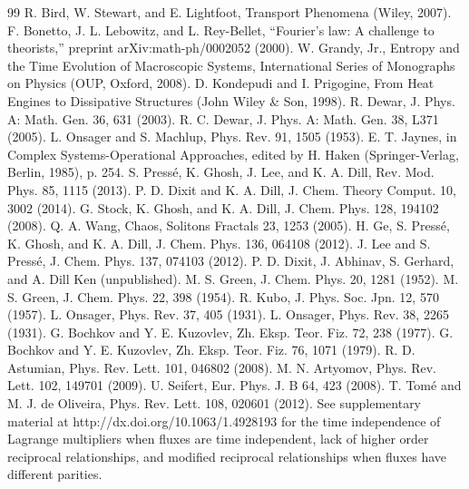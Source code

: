 \documentclass[aps,pra,twocolumn]{revtex4-1}
\begin{document}
\begin{thebibliography}{99}
     R. Bird, W. Stewart, and E. Lightfoot, Transport Phenomena (Wiley, 2007).
     F. Bonetto, J. L. Lebowitz, and L. Rey-Bellet, ``Fourier's law: A challenge to theorists,'' preprint arXiv:math-ph/0002052 (2000).
     W. Grandy, Jr., Entropy and the Time Evolution of Macroscopic Systems, International Series of Monographs on Physics (OUP, Oxford, 2008).
     D. Kondepudi and I. Prigogine, From Heat Engines to Dissipative Structures (John Wiley \& Son, 1998).
     R. Dewar, J. Phys. A: Math. Gen. 36, 631 (2003).
     R. C. Dewar, J. Phys. A: Math. Gen. 38, L371 (2005).
     L. Onsager and S. Machlup, Phys. Rev. 91, 1505 (1953).
     E. T. Jaynes, in Complex Systems-Operational Approaches, edited by H. Haken (Springer-Verlag, Berlin, 1985), p. 254.
     S. Pressé, K. Ghosh, J. Lee, and K. A. Dill, Rev. Mod. Phys. 85, 1115 (2013).
     P. D. Dixit and K. A. Dill, J. Chem. Theory Comput. 10, 3002 (2014).
     G. Stock, K. Ghosh, and K. A. Dill, J. Chem. Phys. 128, 194102 (2008).
     Q. A. Wang, Chaos, Solitons Fractals 23, 1253 (2005).
     H. Ge, S. Pressé, K. Ghosh, and K. A. Dill, J. Chem. Phys. 136, 064108 (2012).
     J. Lee and S. Pressé, J. Chem. Phys. 137, 074103 (2012).
     P. D. Dixit, J. Abhinav, S. Gerhard, and A. Dill Ken (unpublished).
     M. S. Green, J. Chem. Phys. 20, 1281 (1952).
     M. S. Green, J. Chem. Phys. 22, 398 (1954).
     R. Kubo, J. Phys. Soc. Jpn. 12, 570 (1957).
     L. Onsager, Phys. Rev. 37, 405 (1931).
     L. Onsager, Phys. Rev. 38, 2265 (1931).
     G. Bochkov and Y. E. Kuzovlev, Zh. Eksp. Teor. Fiz. 72, 238 (1977).
     G. Bochkov and Y. E. Kuzovlev, Zh. Eksp. Teor. Fiz. 76, 1071 (1979).
     R. D. Astumian, Phys. Rev. Lett. 101, 046802 (2008).
     M. N. Artyomov, Phys. Rev. Lett. 102, 149701 (2009).
     U. Seifert, Eur. Phys. J. B 64, 423 (2008).
     T. Tomé and M. J. de Oliveira, Phys. Rev. Lett. 108, 020601 (2012).
     See supplementary material at http://dx.doi.org/10.1063/1.4928193 for the time independence of Lagrange multipliers when fluxes are time independent, lack of higher order reciprocal relationships, and modified reciprocal relationships when fluxes have different parities.
\end{thebibliography}
\end{document}
